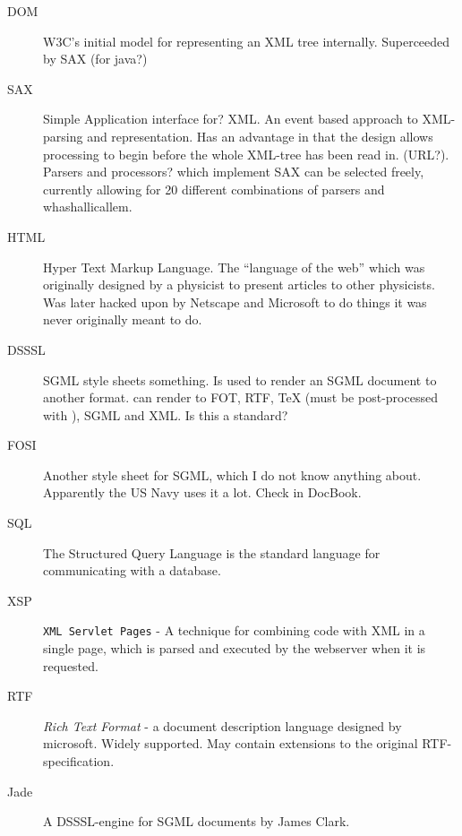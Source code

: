 \begin{description}
\item[DOM] \textsf{W3C's initial model for representing an XML tree
    internally.  Superceeded by SAX (\textsf{for java?)}}
  
\item[SAX] Simple Application \textsf{interface for?} XML.  An event
  based approach to XML-parsing and representation.  Has an advantage
  in that the design allows processing to begin before the whole
  XML-tree has been read in.  (\textsf{URL?}).  Parsers and
  \textsf{processors?} which implement SAX can be selected freely,
  currently allowing for \textsf{20 different combinations of parsers
    and whashallicallem}.


\item[HTML] Hyper Text Markup Language.  The ``language of the web''
  which was originally designed by a physicist to present articles to
  other physicists.  Was later hacked upon by Netscape and Microsoft
  to do things it was never originally meant to do.

  
\item[DSSSL] \textsf{SGML style sheets something}.  Is used to render
  an SGML document to another format.   can render
  to \textsf{FOT}, RTF, {\TeX} (must be post-processed with
  ), SGML and XML.  \textsf{Is this a standard?}
  
\item[FOSI]  \textsf{Another style sheet for SGML}, which I do
  not know anything about.  Apparently the US Navy uses it a lot.
\textsf{  Check in DocBook.}

  
\item[SQL] The Structured Query Language is the \textsf{standard}
  language for communicating with a database.

  
\item[XSP] \texttt{XML Servlet Pages} - A technique for combining code
  with XML in a single page, which is parsed and executed by the
  webserver when it is requested.

\item[RTF] \textit{Rich Text Format} - a document description language
\textsf{designed by microsoft}.  Widely supported.  May contain
extensions to the original RTF-specification.

\item[Jade] A DSSSL-engine for SGML documents by James Clark.


\end{description}
